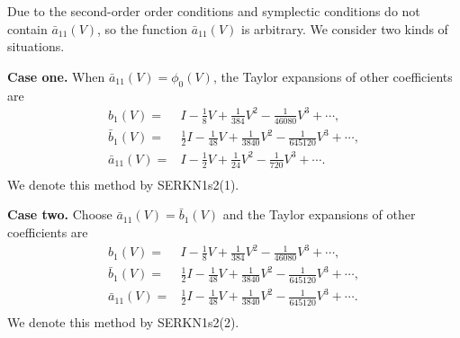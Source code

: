 \documentclass{article}
\begin{document}
Due to the second-order order conditions  and  symplectic conditions
do not contain $\bar{a}_{11}(V)$, so the function  $\bar{a}_{11}(V)$
is arbitrary. We consider two kinds of situations.

 \textbf{Case one.}
When $\bar{a}_{11}(V)=\phi_{0}(V)$, the Taylor expansions of other
coefficients   are
\begin{equation}
\begin{aligned}
b_1(V)=&I -\frac{1}{8}V + \frac{1}{384} V^2  - \frac{1}{46080} V^3 +
\cdots,
\\
 \bar{b}_1(V)=&
 \frac{1}{2}I -\frac{1}{48}V + \frac{1}{3840} V^2  -
\frac{1}{645120}
  V^3 + \cdots,
\\
\bar{a}_{11}(V)=& I  -\frac{1}{2}V + \frac{1}{24}V^2
-\frac{1}{720}V^3 +\cdots
.\\
\end{aligned}
\end{equation}
We denote this method by SERKN1s2(1).

 \textbf{Case two.} Choose
$\bar{a}_{11}(V)=\bar{b}_1(V)$ and the Taylor expansions of other
coefficients   are
\begin{equation}
\begin{aligned}
b_1(V)=&I -\frac{1}{8} V + \frac{1}{384} V^2  - \frac{1}{46080} V^3
+ \cdots,
\\
 \bar{b}_1(V)=&
 \frac{1}{2}I -\frac{1}{48}
  V + \frac{1}{3840}V^2 - \frac{1}{645120}
  V^3 + \cdots,\\
\bar{a}_{11}(V)=&\frac{1}{2}I -\frac{1}{48}V + \frac{1}{3840} V^2
-\frac{1}{645120}V^3 +  \cdots.
\\
\end{aligned}
\end{equation}
We denote this method by SERKN1s2(2).
\end{document}
